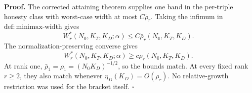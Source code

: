 \textbf{Proof.}
The corrected attaining theorem supplies one band in the per-triple honesty class with worst-case width at most \(C\bar\rho_r\).  Taking the infimum in \(\mathrm{def:minimax\mbox{-}width}\) gives
\[
 W_r^*(N_0,K_T,K_D;\alpha)\le C\bar\rho_r(N_0,K_T,K_D).
\]
The normalization-preserving converse gives
\[
 W_r^*(N_0,K_T,K_D;\alpha)\ge c\rho_r(N_0,K_T,K_D).
\]
At rank one, \(\bar\rho_1=\rho_1=(N_0K_D)^{-1/2}\), so the bounds match.  At every fixed rank \(r\ge2\), they also match whenever \(\eta_D(K_D)=O(\rho_r)\).  No relative-growth restriction was used for the bracket itself. \(\square\)